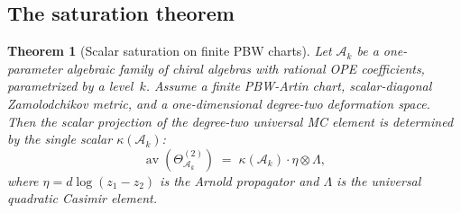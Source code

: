 \documentclass[11pt,reqno]{amsart}
\newtheorem{theorem}{Theorem}[section]
\theoremstyle{definition}
\theoremstyle{remark}
\newcommand{\cA}{\mathcal{A}}
\DeclareMathOperator{\av}{av}
\numberwithin{equation}{section}
\begin{document}
\subsection{The saturation theorem}

\begin{theorem}[Scalar saturation on finite PBW charts]
\label{thm:kfc-scalar-saturation}
Let $\cA_k$ be a one-parameter algebraic family of chiral algebras
with rational OPE coefficients, parametrized by a level~$k$.
Assume a finite PBW-Artin chart, scalar-diagonal Zamolodchikov
metric, and a one-dimensional degree-two deformation space.
Then the scalar projection of the degree-two universal MC element
is determined by the single scalar $\kappa(\cA_k)$:
\begin{equation}\label{eq:scalar-saturation}
\av\!\left(\Theta_{\cA_k}^{(2)}\right)
 \;=\; \kappa(\cA_k) \cdot \eta \otimes \Lambda,
\end{equation}
where $\eta = d\log(z_1 - z_2)$ is the Arnold propagator and
$\Lambda$ is the universal quadratic Casimir element.
\end{theorem}
\end{document}
